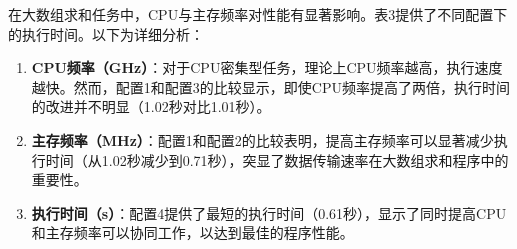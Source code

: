 \documentclass{article}
\begin{document}
\begin{enumerate}
    在大数组求和任务中，CPU与主存频率对性能有显著影响。表3提供了不同配置下的执行时间。以下为详细分析：

\begin{enumerate}
    \item \textbf{CPU频率（GHz）}：对于CPU密集型任务，理论上CPU频率越高，执行速度越快。然而，配置1和配置3的比较显示，即使CPU频率提高了两倍，执行时间的改进并不明显（1.02秒对比1.01秒）。
    \item \textbf{主存频率（MHz）}：配置1和配置2的比较表明，提高主存频率可以显著减少执行时间（从1.02秒减少到0.71秒），突显了数据传输速率在大数组求和程序中的重要性。
    \item \textbf{执行时间（s）}：配置4提供了最短的执行时间（0.61秒），显示了同时提高CPU和主存频率可以协同工作，以达到最佳的程序性能。
\end{enumerate}
\end{enumerate}
\end{document}
